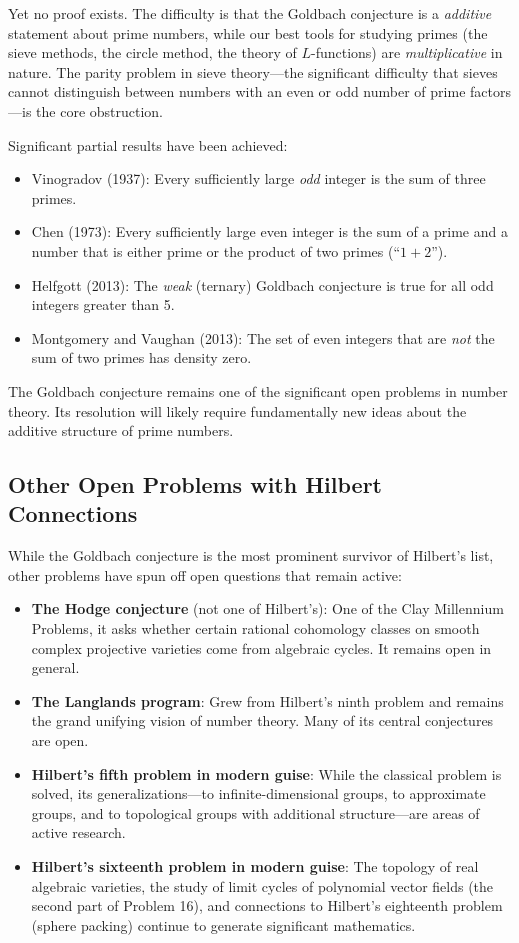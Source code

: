 Yet no proof exists. The difficulty is that the Goldbach conjecture is a \emph{additive} statement about prime numbers, while our best tools for studying primes (the sieve methods, the circle method, the theory of $L$-functions) are \emph{multiplicative} in nature. The parity problem in sieve theory---the significant difficulty that sieves cannot distinguish between numbers with an even or odd number of prime factors---is the core obstruction.

Significant partial results have been achieved:
\begin{itemize}
    \item Vinogradov (1937): Every sufficiently large \emph{odd} integer is the sum of three primes.
    \item Chen (1973): Every sufficiently large even integer is the sum of a prime and a number that is either prime or the product of two primes (``$1 + 2$'').
    \item Helfgott (2013): The \emph{weak} (ternary) Goldbach conjecture is true for all odd integers greater than 5.
    \item Montgomery and Vaughan (2013): The set of even integers that are \emph{not} the sum of two primes has density zero.
\end{itemize}

The Goldbach conjecture remains one of the significant open problems in number theory. Its resolution will likely require fundamentally new ideas about the additive structure of prime numbers.

\subsection{Other Open Problems with Hilbert Connections}

While the Goldbach conjecture is the most prominent survivor of Hilbert's list, other problems have spun off open questions that remain active:

\begin{itemize}
    \item \textbf{The Hodge conjecture} (not one of Hilbert's): One of the Clay Millennium Problems, it asks whether certain rational cohomology classes on smooth complex projective varieties come from algebraic cycles. It remains open in general.
    \item \textbf{The Langlands program}: Grew from Hilbert's ninth problem and remains the grand unifying vision of number theory. Many of its central conjectures are open.
    \item \textbf{Hilbert's fifth problem in modern guise}: While the classical problem is solved, its generalizations---to infinite-dimensional groups, to approximate groups, and to topological groups with additional structure---are areas of active research.
    \item \textbf{Hilbert's sixteenth problem in modern guise}: The topology of real algebraic varieties, the study of limit cycles of polynomial vector fields (the second part of Problem 16), and connections to Hilbert's eighteenth problem (sphere packing) continue to generate significant mathematics.
\end{itemize}

